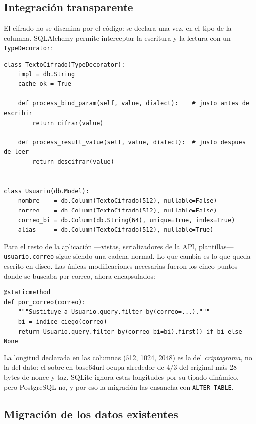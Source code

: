 \documentclass[11pt,letterpaper]{article}
\begin{document}
\subsection{Integración transparente}

El cifrado no se disemina por el código: se declara una vez, en el tipo de la
columna. SQLAlchemy permite interceptar la escritura y la lectura con un
\texttt{TypeDecorator}:

\begin{lstlisting}[style=py,caption={\texttt{models.py} — el cifrado ocurre en el borde de SQLAlchemy.}]
class TextoCifrado(TypeDecorator):
    impl = db.String
    cache_ok = True

    def process_bind_param(self, value, dialect):    # justo antes de escribir
        return cifrar(value)

    def process_result_value(self, value, dialect):  # justo despues de leer
        return descifrar(value)


class Usuario(db.Model):
    nombre    = db.Column(TextoCifrado(512), nullable=False)
    correo    = db.Column(TextoCifrado(512), nullable=False)
    correo_bi = db.Column(db.String(64), unique=True, index=True)
    alias     = db.Column(TextoCifrado(512), nullable=True)
\end{lstlisting}

Para el resto de la aplicación —vistas, serializadores de la API,
plantillas— \texttt{usuario.correo} sigue siendo una cadena normal. Lo que
cambia es lo que queda escrito en disco. Las únicas modificaciones necesarias
fueron los cinco puntos donde se buscaba por correo, ahora encapsulados:

\begin{lstlisting}[style=py]
@staticmethod
def por_correo(correo):
    """Sustituye a Usuario.query.filter_by(correo=...)."""
    bi = indice_ciego(correo)
    return Usuario.query.filter_by(correo_bi=bi).first() if bi else None
\end{lstlisting}

\begin{nota}
La longitud declarada en las columnas (512, 1024, 2048) es la del
\emph{criptograma}, no la del dato: el sobre en base64url ocupa alrededor de
$4/3$ del original más 28 bytes de nonce y tag. SQLite ignora estas longitudes
por su tipado dinámico, pero PostgreSQL no, y por eso la migración las
ensancha con \texttt{ALTER TABLE}.
\end{nota}

\subsection{Migración de los datos existentes}
\end{document}
